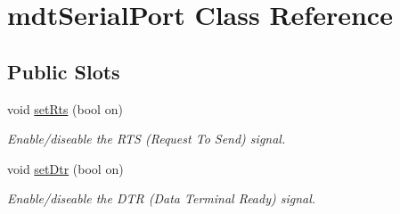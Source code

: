 \hypertarget{classmdt_serial_port}{
\section{mdtSerialPort Class Reference}
\label{classmdt_serial_port}
}
\subsection*{Public Slots}
\begin{DoxyCompactItemize}
\item 
void \hyperlink{classmdt_serial_port_af0534e9f2e25b44a1a127d2a34b409fb}{setRts} (bool on)
\begin{DoxyCompactList}\small\item\em Enable/diseable the RTS (Request To Send) signal. \end{DoxyCompactList}\item 
void \hyperlink{classmdt_serial_port_a91ec8a600f09b6844d36902fe1e16592}{setDtr} (bool on)
\begin{DoxyCompactList}\small\item\em Enable/diseable the DTR (Data Terminal Ready) signal. \end{DoxyCompactList}\end{DoxyCompactItemize}
